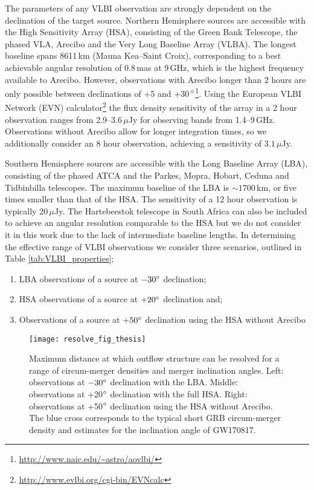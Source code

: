 The parameters of any VLBI observation are strongly dependent on the declination of the target source. Northern Hemisphere sources are accessible with the High Sensitivity Array (HSA), consisting of the Green Bank Telescope, the phased VLA, Arecibo and the Very Long Baseline Array (VLBA). The longest baseline spans 8611\,km (Mauna Kea--Saint Croix), corresponding to a best achievable angular resolution of 0.8\,mas at 9\,GHz, which is the highest frequency available to Arecibo. However, observations with Arecibo longer than 2 hours are only possible between declinations of +5 and +30\,$\mbox{$^\circ$}$\footnote{\url{http://www.naic.edu/~astro/aovlbi/}}. Using the European VLBI Network (EVN) calculator\footnote{\url{http://www.evlbi.org/cgi-bin/EVNcalc}} the flux density sensitivity of the array in a 2 hour observation ranges from 2.9--3.6\,$\mu$Jy for observing bands from 1.4--9\,GHz. Observations without Arecibo allow for longer integration times, so we additionally consider an 8 hour observation, achieving a sensitivity of $3.1\,\mu$Jy.

Southern Hemisphere sources are accessible with the Long Baseline Array (LBA), consisting of the phased ATCA and the Parkes, Mopra, Hobart, Ceduna and Tidbinbilla telescopes. The maximum baseline of the LBA is $\sim1700\,$km, or five times smaller than that of the HSA. The sensitivity of a 12 hour observation is typically 20\,$\mu$Jy. The Hartebeestok telescope in South Africa can also be included to achieve an angular resolution comparable to the HSA but we do not consider it in this work due to the lack of intermediate baseline lengths. In determining the effective range of VLBI observations we consider three scenarios, outlined in Table \ref{tab:VLBI_properties};
\begin{enumerate}
    \item LBA observations of a source at $-30\mbox{$^\circ$}$ declination;
    \item HSA observations of a source at $+20\mbox{$^\circ$}$ declination and;
    \item Observations of a source at $+50\mbox{$^\circ$}$ declination using the HSA without Arecibo
\end{enumerate}

\begin{figure*}
\texttt{[image: resolve\_fig\_thesis]}
\caption[Detectability of outflow structure with VLBI]{Maximum distance at which outflow structure can be resolved for a range of circum-merger densities and merger inclination angles. Left: observations at $-30\mbox{$^\circ$}$ declination with the LBA. Middle: observations at +20$\mbox{$^\circ$}$ declination with the full HSA. Right: observations at +50$\mbox{$^\circ$}$ declination using the HSA without Arecibo. The blue cross corresponds to the typical short GRB circum-merger density and estimates for the inclination angle of GW170817.}
\label{fig:size_detectability}
\end{figure*}

